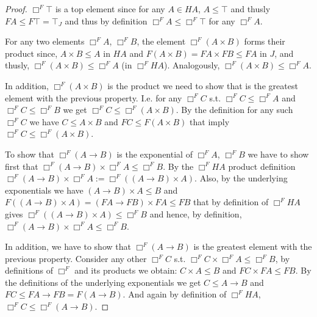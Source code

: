 \begin{proof}
    $\Box^F \top$ is a top element since for any $A\in HA$, 
    $A\le \top$ and thusly $FA\le F\top=\top_J$ and thus by definition
    $\Box^F A\le\Box^F\top $ for any $\Box^F A$.

    For any two elements $\Box^F A$, $\Box^F B$, 
    the element $\Box^F (A \times B)$ forms their product since,
    $A \times B\le A$ in $HA$ and $F(A\times B)=FA\times FB \le FA$
    in $J$, and thusly, 
    $\Box^F (A \times B)\le \Box^FA$ (in $\Box^F HA$).
    Analogously, $\Box^F (A \times B)\le \Box^FA$.

    In addition, $\Box^F (A \times B)$ is the product we need to show 
    that is the greatest element with the previous property.
    I.e. for any $\Box^F C$ s.t. $\Box^F C\le \Box^F A $ and 
    $\Box^F C\le \Box^F B $ we get $\Box^F C\le\Box^F(A\times B)$. 
    By the definition for any such  $\Box^F C$ we have 
    $C\le A\times B$ and $FC\le F(A\times B)$ that imply 
    $\Box^F C\le\Box^F(A\times B)$.

    To show that  $\Box^F(A\rightarrow B)$ is the  
    exponential of $\Box^FA$, $\Box^FB$
    we have to show first that 
    $\Box^F ( A\rightarrow B)\times\Box^F A\le \Box^F B$.
    By the $\Box^F HA$ product definition 
    $\Box^F ( A\rightarrow B)\times\Box^F A :=\Box^F( (A\rightarrow B)\times A)$. 
    Also,
    by the underlying exponentials we have $ (A\rightarrow B)\times A\le B$ 
    and  $F((A\rightarrow B)\times A)= (FA\rightarrow FB)\times FA \le FB$
    that by definition of $\Box^F HA$ gives   
    $\Box^F((A\rightarrow B)\times A)\le \Box^F B$ 
    and hence, by definition, 
    $\Box^F ( A\rightarrow B)\times \Box^F A\le \Box^F B$.

    In addition, we have to show that 
    $\Box^F ( A\rightarrow B)$ is the 
    greatest element with the previous property.
    Consider any other $\Box^F C$ s.t. $\Box^F C\times\Box^F A\le \Box^F B$, 
    by definitions of $\Box^F$ and its products we obtain: $C\times A\le B$
     and $FC\times FA\le FB$.
      By the definitions of the underlying exponentials 
     we get $C\le A\rightarrow B$ and 
     $FC \le FA\rightarrow FB =F(A\rightarrow B)$. 
     And again by definition of $\Box^F HA$, $\Box^F C\le \Box^F(A\rightarrow B)$.  
\end{proof}

